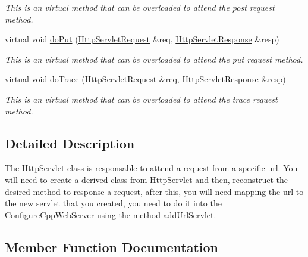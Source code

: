 \begin{DoxyCompactItemize}
\begin{DoxyCompactList}\small\item\em This is an virtual method that can be overloaded to attend the post request method. \end{DoxyCompactList}\item 
virtual void \hyperlink{class_http_servlet_a3e92ff7912f54a5515681637a912eb47}{do\+Put} (\hyperlink{class_http_servlet_request}{Http\+Servlet\+Request} \&req, \hyperlink{class_http_servlet_response}{Http\+Servlet\+Response} \&resp)
\begin{DoxyCompactList}\small\item\em This is an virtual method that can be overloaded to attend the put request method. \end{DoxyCompactList}\item 
virtual void \hyperlink{class_http_servlet_a83219b58e63bbe96fa2373a043043e20}{do\+Trace} (\hyperlink{class_http_servlet_request}{Http\+Servlet\+Request} \&req, \hyperlink{class_http_servlet_response}{Http\+Servlet\+Response} \&resp)
\begin{DoxyCompactList}\small\item\em This is an virtual method that can be overloaded to attend the trace request method. \end{DoxyCompactList}\end{DoxyCompactItemize}


\subsection{Detailed Description}
The \hyperlink{class_http_servlet}{Http\+Servlet} class is responsable to attend a request from a specific url. You will need to create a derived class from \hyperlink{class_http_servlet}{Http\+Servlet} and then, reconstruct the desired method to response a request, after this, you will need mapping the url to the new servlet that you created, you need to do it into the Configure\+Cpp\+Web\+Server using the method add\+Url\+Servlet. 

\subsection{Member Function Documentation}
\mbox{\label{class_http_servlet_a6c6c9f516aee7f9f4b2677b6d2b756e6}} 
